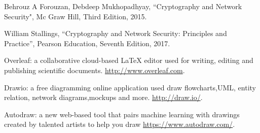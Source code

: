 \documentclass[12pt,a4paper]{article}
\begin{document}
\begin{thebibliography}{plain}

 Behrouz A Forouzan, Debdeep Mukhopadhyay,
``Cryptography and Network Security", Mc Graw Hill, Third Edition,
2015.

 William Stallings, ``Cryptography and Network
Security: Principles and Practice”, Pearson Education, Seventh Edition,
2017.

 Overleaf: a collaborative cloud-based LaTeX editor
used for writing, editing and publishing scientific documents.
\url{http://www.overleaf.com}.

 Drawio: a free diagramming online application used draw flowcharts,UML, entity relation, network diagrams,mockups and more. 
\url{http://draw.io/}.

 Autodraw: a new web-based tool that pairs machine learning with drawings created by talented artists to help you draw
\url{https://www.autodraw.com/}.

\end{thebibliography}
\end{document}
